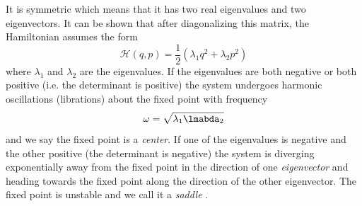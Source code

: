 It is symmetric which means that it has two real 
eigenvalues and two eigenvectors. It can be shown that after 
diagonalizing this matrix, the Hamiltonian assumes the form
\begin{equation}
    \mathcal{H}(q,p)= \frac{1}{2} (\lambda_1 q^2 + \lambda_2 p^2)
\end{equation}
where $\lambda_1$ and $\lambda_2$ are the eigenvalues. If the
eigenvalues are both negative or both positive (i.e. the
determinant is positive) the system undergoes
harmonic oscillations (librations) about the fixed point with 
frequency
\begin{equation}
    \omega = \sqrt{\lambda_1\lmabda_2}
\end{equation}
and we say the fixed point is a \emph{center}. If one of the 
eigenvalues is negative and the other positive (the determinant
is negative) the system is
diverging exponentially away from the fixed point in the 
direction of one \emph{eigenvector} and heading towards the 
fixed point along the direction of the other eigenvector. The
fixed point is unstable and we call it a \emph{saddle} .

